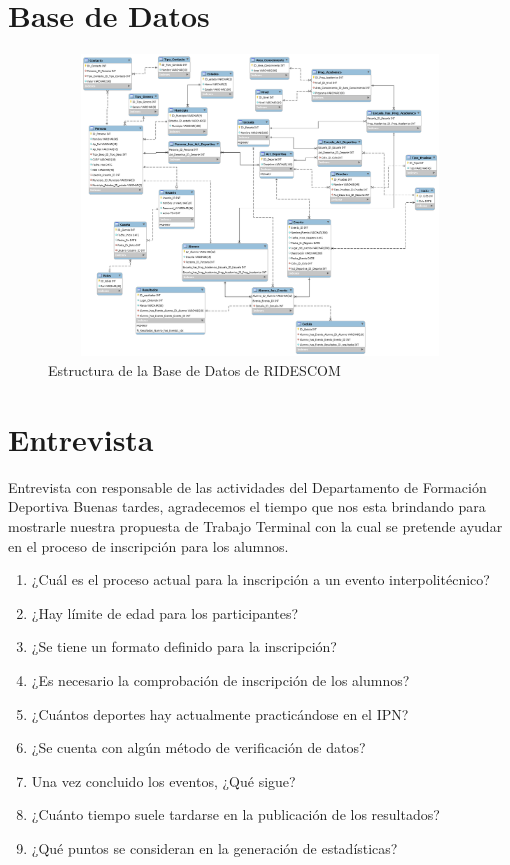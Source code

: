 	
	\section{Base de Datos}
		\begin{figure}[hbt!]
			\centering
			\includegraphics[width=16cm, height=8cm]{Imagenes/Disenos/BasedeDatos.png}
			\caption{Estructura de la Base de Datos de RIDESCOM}
			\label{BaseDatos}
		\end{figure}
	
	\section{Entrevista}
		Entrevista con responsable de las actividades del Departamento de Formación Deportiva
		Buenas tardes, agradecemos el tiempo que nos esta brindando para mostrarle nuestra propuesta de Trabajo Terminal con la cual se pretende ayudar en el proceso de inscripción para los alumnos.
		\label{Entrevista}
		\begin{enumerate}
			\item ¿Cuál es el proceso actual para la inscripción a un evento interpolitécnico?
			\item ¿Hay límite de edad para los participantes?
			\item ¿Se tiene un formato definido para la inscripción?
			\item ¿Es necesario la comprobación de inscripción de los alumnos?
			\item ¿Cuántos deportes hay actualmente practicándose en el IPN?
			\item ¿Se cuenta con algún método de verificación de datos?
			\item Una vez concluido los eventos, ¿Qué sigue?
			\item ¿Cuánto tiempo suele tardarse en la publicación de los resultados?
			\item ¿Qué puntos se consideran en la generación de estadísticas?
		\end{enumerate} 
